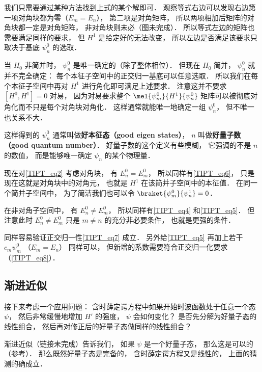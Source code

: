 我们只需要通过某种方法找到上式的某个解即可． 观察等式右边可以发现右边第一项对角块都为零（$E_m = E_n$）， 第二项是对角矩阵， 所以两项相加后矩阵的对角块都一定是对角矩阵， 非对角块则未必（图未完成）． 所以等式左边的矩阵也需要满足同样的要求， 但 $H^1$ 是给定好的无法改变， 所以左边是否满足该要求只取决于基底 $\psi_n^0$ 的选取．

当 $H_0$ 非简并时， $\psi_n^0$ 是唯一确定的（除了整体相位）． 但现在 $H_0$ 简并， $\psi_n^0$ 就并不完全确定： 每个本征子空间中的正交归一基底可以任意选取． 所以我们在每个本征子空间中再对 $H^1$ 进行角化即可满足上述要求． 注意这并不要求 $[H^0, H^1] = 0$ 对易， 因为对易要求整个 $\mel{\psi_m^0}{H^1}{\psi_n^0}$ 矩阵可以被彻底对角化而不只是每个对角块对角化． 这样通常就能唯一地确定一组 $\psi_n^0$， 但不唯一也关系不大．

这样得到的 $\psi_n^0$ 通常叫做\textbf{好本征态（good eigen states）}， $n$ 叫做\textbf{好量子数（good quantum number）}． 好量子数的这个定义有些模糊， 它强调的不是 $n$ 的数值， 而是能够唯一确定 $\psi_n$ 的某个物理量．

现在对\autoref{TIPT_eq2} 考虑对角块， 有 $E_n^0 = E_m^0$， 所以同样有\autoref{TIPT_eq6}， 只是现在这就是对角块中的对角元， 也就是 $H^1$ 在该简并子空间中的本征值． 在同一个简并子空间中， 为了简洁我们也可以令 $\braket{\psi_m^0}{\psi_n^1} = 0$．

在非对角子空间中， 有 $E_n^0 \ne E_m^0$， 所以同样有\autoref{TIPT_eq4} 和\autoref{TIPT_eq5}． 但注意此时 $E_n^0 \ne E_m^0$ 只是 $m \ne n$ 的充分非必要条件， 也就是更强的条件．

同样容易验证正交归一性\autoref{TIPT_eq7} 成立． 另外给\autoref{TIPT_eq5} 再加上若干 $c_m \psi_m^0$ （$E_m = E_n$） 同样可以， 但新增的系数需要符合正交归一化要求（\autoref{TIPT_eq8}）．

\subsection{渐进近似}
接下来考虑一个应用问题： 含时薛定谔方程中如果开始时波函数处于任意一个态 $\psi$， 然后非常缓慢地增加 $H'$ 的强度， $\psi$ 会如何变化？ 是否先分解为好量子态的线性组合， 然后再对修正后的好量子态做同样的线性组合？

渐进近似（链接未完成）告诉我们， 如果 $\psi$ 是一个好量子态， 那么这是可以的（参考\cite{GriffQ}）． 那么既然好量子态是完备的， 含时薛定谔方程又是线性的， 上面的猜测的确成立．
